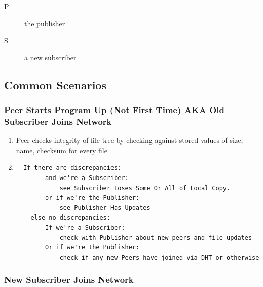 \documentclass[12pt,a4paper,]{book}
\begin{document}
\begin{description}
\item[P]
the publisher
\item[S]
a new subscriber
\end{description}

\subsection{Common Scenarios}\label{common-scenarios}

\subsubsection{Peer Starts Program Up (Not First Time) AKA Old
Subscriber Joins
Network}\label{peer-starts-program-up-not-first-time-aka-old-subscriber-joins-network}

\begin{enumerate}
\def\labelenumi{\arabic{enumi}.}
\item
  Peer checks integrity of file tree by checking against stored values
  of size, name, checksum for every file
\item
\begin{verbatim}
  If there are discrepancies:
        and we're a Subscriber:
            see Subscriber Loses Some Or All of Local Copy.
        or if we're the Publisher:
            see Publisher Has Updates
    else no discrepancies:
        If we're a Subscriber:
            check with Publisher about new peers and file updates
        Or if we're the Publisher:
            check if any new Peers have joined via DHT or otherwise
\end{verbatim}
\end{enumerate}

\subsubsection{New Subscriber Joins
Network}\label{new-subscriber-joins-network}
\end{document}

